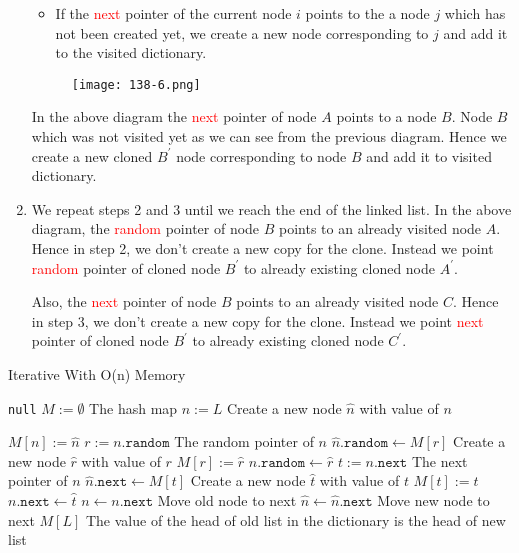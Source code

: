 \begin{enumerate}
\begin{itemize}
        \item If the \textcolor{red}{next} pointer of the current node $i$ points to the a node $j$ which has not been created yet, we create a new node corresponding to $j$ and add it to the visited dictionary.
    \end{itemize}
        \begin{figure}[H]
        \centering
        \texttt{[image: 138-6.png]}
        \end{figure}     
    In the above diagram the \textcolor{red}{next} pointer of node $A$ points to a node $B$. Node $B$ which was not visited yet as we can see from the previous diagram. Hence we create a new cloned $B^{'}$ node corresponding to node $B$ and add it to visited dictionary.
    \item We repeat steps 2 and 3 until we reach the end of the linked list.
    In the above diagram, the \textcolor{red}{random} pointer of node $B$ points to an already visited node $A$. Hence in step 2, we don't create a new copy for the clone. Instead we point \textcolor{red}{random} pointer of cloned node $B^{'}$  to already existing cloned node  $A^{'}$.
    \par
    Also, the \textcolor{red}{next} pointer of node $B$ points to an already visited node $C$. Hence in step 3, we don't create a new copy for the clone. Instead we point \textcolor{red}{next} pointer of cloned node $B^{'}$ to already existing cloned node $C^{'}$.
\end{enumerate}
\begin{algorithm}[H]
\caption{Iterative With O(n) Memory}
\begin{algorithmic}[1]
\State \Return \texttt{null}
\EndIf
\State $M:=\emptyset$ \Comment The hash map
\State $n:=L$
\State Create a new node $\hat{n}$ with value of $n$
\end{algorithmic}
\end{algorithm}
\begin{algorithm}[H]
\begin{algorithmic}[1]
\State $M[n]:=\hat{n}$
\State $r:=n.\texttt{random}$ \Comment The random pointer of $n$
\State $\hat{n}.\texttt{random}\gets M[r]$
\Else
\State Create a new node $\hat{r}$ with value of $r$
\State $M[r]:=\hat{r}$
\State $n.\texttt{random}\gets \hat{r}$
\EndIf
\State $t:=n.\texttt{next}$ \Comment The next pointer of $n$
\State $\hat{n}.\texttt{next}\gets M[t]$
\Else
\State Create a new node $\hat{t}$ with value of $t$
\State $M[t]:=\hat{t}$
\State $n.\texttt{next}\gets \hat{t}$
\EndIf
\State $n\gets n.\texttt{next}$ \Comment Move old node to next
\State $\hat{n}\gets \hat{n}.\texttt{next}$ \Comment Move new node to next
\EndWhile
\State \Return $M[L]$ \Comment The value of the head of old list in the dictionary is the head of new list
\EndProcedure
\end{algorithmic}
\end{algorithm}
